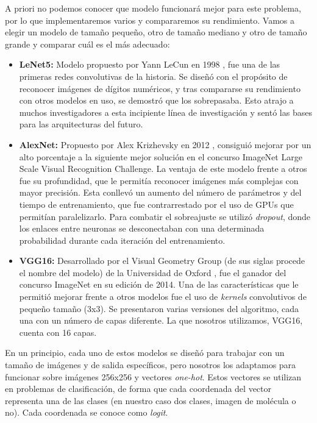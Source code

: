 A priori no podemos conocer que modelo funcionará mejor para este problema, por lo que implementaremos varios y compararemos su rendimiento. Vamos a elegir un modelo de tamaño pequeño, otro de tamaño mediano y otro de tamaño grande y comparar cuál es el más adecuado:
\begin{itemize}
    \item \textbf{LeNet5:} Modelo propuesto por Yann LeCun en 1998 \cite{lecun1998gradient}, fue una de las primeras redes convolutivas de la historia. Se diseñó con el propósito de reconocer imágenes de dígitos numéricos, y tras compararse su rendimiento con otros modelos en uso, se demostró que los sobrepasaba. Esto atrajo a muchos investigadores a esta incipiente línea de investigación y sentó las bases para las arquitecturas del futuro.
    \item \textbf{AlexNet:} Propuesto por Alex Krizhevsky en 2012 \cite{krizhevsky2012imagenet}, consiguió mejorar por un alto porcentaje a la siguiente mejor solución en el concurso ImageNet Large Scale Visual Recognition Challenge. La ventaja de este modelo frente a otros fue su profundidad, que le permitía reconocer imágenes más complejas con mayor precisión. Esta conllevó un aumento del número de parámetros y del tiempo de entrenamiento, que fue contrarrestado por el uso de GPUs que permitían paralelizarlo. Para combatir el sobreajuste se utilizó \textit{dropout}, donde los enlaces entre neuronas se desconectaban con una determinada probabilidad durante cada iteración del entrenamiento.
    \item \textbf{VGG16:} Desarrollado por el Visual Geometry Group (de sus siglas procede el nombre del modelo) de la Universidad de Oxford \cite{https://doi.org/10.48550/arxiv.1409.1556}, fue el ganador del concurso ImageNet en su edición de 2014. Una de las características que le permitió mejorar frente a otros modelos fue el uso de \textit{kernels} convolutivos de pequeño tamaño (3x3). Se presentaron varias versiones del algoritmo, cada una con un número de capas diferente. La que nosotros utilizamos, VGG16, cuenta con 16 capas.
\end{itemize}

En un principio, cada uno de estos modelos se diseñó para trabajar con un tamaño de imágenes y de salida específicos, pero nosotros los adaptamos para funcionar sobre imágenes 256x256 y vectores \textit{one-hot}. Estos vectores se utilizan en problemas de clasificación, de forma que cada coordenada del vector representa una de las clases (en nuestro caso dos clases, imagen de molécula o no). Cada coordenada se conoce como \textit{logit}.

